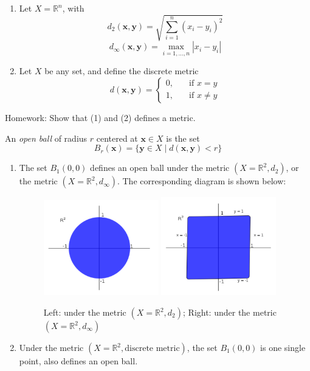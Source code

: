 \begin{example}
\begin{enumerate}
\item
Let $X=\mathbb{R}^n$, with 
\[
d_2(\bm x,\bm y)=\sqrt{\sum_{i=1}^n(x_i-y_i)^2}
\]
\[
d_\infty(\bm x,\bm y)=\max_{i=1,\dots,n}|x_i-y_i|
\]
\item
Let $X$ be any set, and define the discrete metric 
\[
d(\bm x,\bm y)=\left\{
\begin{aligned}
0,&\quad\mbox{if }x=y\\
1,&\quad\mbox{if }x\ne y
\end{aligned}
\right.
\]
\end{enumerate}
Homework: Show that (1) and (2) defines a metric.
\end{example}
\begin{definition}
An \emph{open ball} of radius $r$ centered at $\bm x\in X$ is the set
\[
B_r(\bm x)=\{\bm y\in X\mid d(\bm x,\bm y)<r\}
\]
\end{definition}
\begin{example}
\begin{enumerate}
\item
The set $B_1(0,0)$ defines an open ball under the metric $(X=\mathbb{R}^2,d_2)$, or the metric $(X=\mathbb{R}^2,d_\infty)$. The corresponding diagram is shown below:
 \begin{figure}[H]
\centering
\includegraphics[width=5cm]{week1/f_1_2}
\includegraphics[width=5cm]{week1/f_1_3}
\caption{Left: under the metric $(X=\mathbb{R}^2,d_2)$; Right: under the metric $(X=\mathbb{R}^2,d_\infty)$}
\end{figure}
\item
Under the metric $(X=\mathbb{R}^2,\text{discrete metric})$, the set $B_1(0,0)$ is one single point, also defines an open ball.
\end{enumerate}
\end{example}


